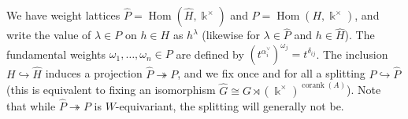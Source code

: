 \documentclass[12pt]{amsart}
\newcommand{\kk}{\Bbbk}%
\newcommand\onto{\twoheadrightarrow}
\newcommand\into{\hookrightarrow}
\DeclareMathOperator{\Hom}{Hom}
\DeclareMathOperator{\corank}{corank}
\theoremstyle{remark}
\numberwithin{equation}{section}
\numberwithin{figure}{section}
\begin{document}
We have weight lattices $\widehat{P} = \Hom(\widehat{H},\kk^\times)$ and $P = \Hom(H,\kk^\times)$, and write the value of $\lambda \in P$ on $h \in H$ as $h^\lambda$ (likewise for $\lambda \in \widehat{P}$ and $h \in \widehat{H}$). The fundamental weights $\omega_1,\dotsc,\omega_n \in P$ are defined by $(t^{\alpha_i^\vee})^{\omega_j} = t^{\delta_{ij}}$. The inclusion $H \into \widehat{H}$ induces a projection $\widehat{P} \onto P$, and we fix once and for all a splitting $P \into \widehat{P}$ (this is equivalent to fixing an isomorphism $\widehat{G} \cong G \rtimes (\kk^\times)^{\corank(A)}$). Note that while $\widehat{P} \onto P$ is $W$-equivariant, the splitting will generally not be.




\end{document}
